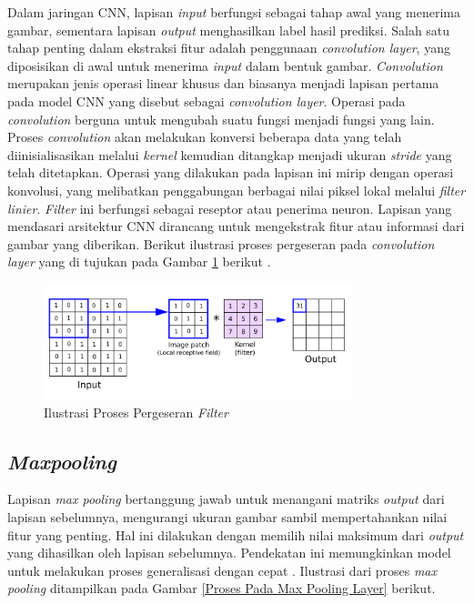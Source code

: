     Dalam jaringan CNN, lapisan \textit{input} berfungsi sebagai tahap awal yang menerima gambar, sementara lapisan \textit{output} menghasilkan label hasil prediksi. Salah satu tahap penting dalam ekstraksi fitur adalah penggunaan \textit{convolution layer}, yang diposisikan di awal untuk menerima \textit{input} dalam bentuk gambar. \textit{Convolution} merupakan jenis operasi linear khusus dan biasanya menjadi lapisan
    pertama pada model CNN yang disebut sebagai \textit{convolution layer}. Operasi pada
    \textit{convolution} berguna untuk mengubah suatu fungsi menjadi fungsi yang lain. Proses \textit{convolution} akan melakukan konversi
    beberapa data yang telah diinisialisasikan melalui \textit{kernel} kemudian ditangkap
    menjadi ukuran \textit{stride} yang telah ditetapkan.
    Operasi yang dilakukan pada lapisan ini mirip dengan operasi konvolusi, yang melibatkan penggabungan berbagai nilai piksel lokal melalui \textit{filter linier}. \textit{Filter} ini berfungsi sebagai reseptor atau penerima neuron. Lapisan yang mendasari arsitektur CNN dirancang untuk mengekstrak fitur atau informasi dari gambar yang diberikan. Berikut ilustrasi proses pergeseran pada \textit{convolution layer} yang di tujukan pada Gambar \ref{Ilustrasi Proses Pergeseran Filter Pada Convolutional Layer} berikut \cite{Dewi2018}.

  \begin{figure}[H]
      \centering
      \includegraphics[width=0.8\textwidth]{figures/bab2/cnn.png}
      \caption[Ilustrasi Proses Pergeseran \textit{Filter}]{Ilustrasi Proses Pergeseran \textit{Filter} \cite{Reynolds}}
      \label{Ilustrasi Proses Pergeseran Filter Pada Convolutional Layer}
    
 \end{figure}


\subsection{\textit{Maxpooling}}

    Lapisan \textit{max pooling} bertanggung jawab untuk menangani matriks \textit{output} dari lapisan sebelumnya, mengurangi ukuran gambar sambil mempertahankan nilai fitur yang penting. Hal ini dilakukan dengan memilih nilai maksimum dari \textit{output} yang dihasilkan oleh lapisan sebelumnya. Pendekatan ini memungkinkan model untuk melakukan proses generalisasi dengan cepat \cite{Gholamalinezhad2020, Nagi2011MaxpoolingCN}. Ilustrasi dari proses \textit{max pooling} ditampilkan pada Gambar \ref{Proses Pada Max Pooling Layer} berikut.


